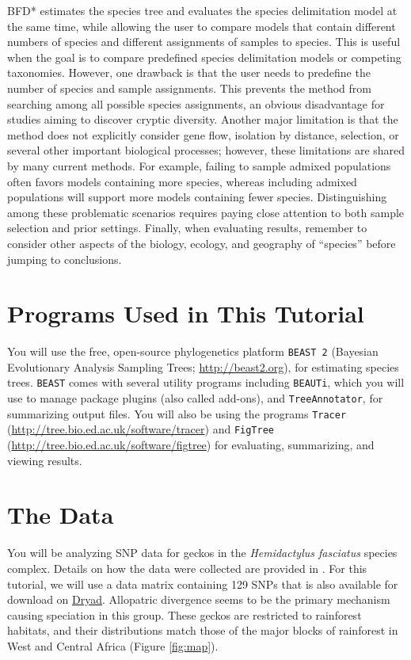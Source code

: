 \documentclass{article}
\begin{document}
BFD* estimates the species tree and evaluates the species delimitation model at the same time, while allowing the user to compare models that contain different numbers of species and different assignments of samples to species. This is useful when the goal is to compare predefined species delimitation models or competing taxonomies. However, one drawback is that the user needs to predefine the number of species and sample assignments. This prevents the method from searching among all possible species assignments, an obvious disadvantage for studies aiming to discover cryptic diversity. Another major limitation is that the method does not explicitly consider gene flow, isolation by distance, selection, or several other important biological processes; however, these limitations are shared by many current methods. For example, failing to sample admixed populations often favors models containing more species, whereas including admixed populations will support more models containing fewer species. Distinguishing among these problematic scenarios requires paying close attention to both sample selection and prior settings. Finally, when evaluating results, remember to consider other aspects of the biology, ecology, and geography of ``species'' before jumping to conclusions.

\section{Programs Used in This Tutorial}
You will use the free, open-source phylogenetics platform \texttt{BEAST 2} (Bayesian
Evolutionary Analysis Sampling Trees;
\href{http://beast2.org}{\url{http://beast2.org}}), for
estimating species trees.
\texttt{BEAST} comes with several utility programs including \texttt{BEAUTi}, which you will use to manage package plugins (also called add-ons), and \texttt{TreeAnnotator}, for summarizing output files.
You will also be using the programs \texttt{Tracer}
(\href{http://tree.bio.ed.ac.uk/software/tracer}{\url{http://tree.bio.ed.ac.uk/software/tracer}})
and \texttt{FigTree}
(\href{http://tree.bio.ed.ac.uk/software/figtree}{\url{http://tree.bio.ed.ac.uk/software/figtree}})
for evaluating, summarizing, and viewing results.

\section{The Data}
You will be analyzing SNP data for geckos in the \textit{Hemidactylus fasciatus} species complex. Details on how the data were collected are 
provided in \cite{Leache14}. For this tutorial, we will use a data matrix containing 129 SNPs that is also available for download on \href{http://datadryad.org/resource/doi:10.5061/dryad.r55fb}{Dryad}. Allopatric divergence seems to be the primary mechanism causing speciation in this group. These geckos are restricted to rainforest habitats, and their distributions match those of the major blocks of rainforest in West and Central Africa (Figure \ref{fig:map}). 
\end{document}
